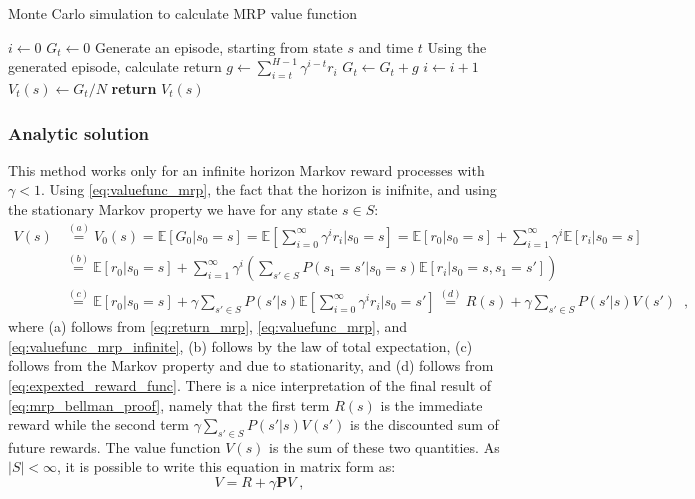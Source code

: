\documentclass{article}
\theoremstyle{definition}
\theoremstyle{remark}
\newcommand{\E}{\mathbb{E}}                                        %
\begin{document}
\begin{algorithm}
\caption{Monte Carlo simulation to calculate MRP value function}\label{alg:mrp1}
\begin{algorithmic}[1]
\State $i\gets 0$
\State $G_t\gets 0$
\State Generate an episode, starting from state $s$ and time $t$
\State Using the generated episode, calculate return $g \gets \sum_{i=t}^{H-1}\gamma^{i-t} r_i$ 
\State $G_t\gets G_t + g$
\State $i\gets i + 1$
\EndWhile\label{mrp1label}
\State $V_t(s) \gets G_t / N$
\State \textbf{return} $V_t(s)$
\EndProcedure
\end{algorithmic}
\end{algorithm}

\subsubsection{Analytic solution}
This method works only for an infinite horizon Markov reward processes with $\gamma < 1$. Using \eqref{eq:valuefunc_mrp}, the fact that the horizon is inifnite, and using the stationary Markov property we have for any state $s \in S$:
\begin{equation}
\begin{split}
V(s) &\stackrel{(a)}{=} V_0(s) = \E[G_0|s_0 = s] = \E \left[\sum_{i=0}^{\infty}\gamma^{i} r_i \bigg|s_0 = s \right] = \E [r_0 | s_0 = s] + \sum_{i=1}^{\infty}\gamma^{i} \E [r_i|s_0 = s] \\
&\stackrel{(b)}{=} \E [r_0 | s_0 = s] + \sum_{i=1}^{\infty}\gamma^{i} \left( \sum_{s' \in S}P(s_1 = s' | s_0 = s) \E [r_i|s_0 = s, s_1 = s'] \right) \\
&\stackrel{(c)}{=} \E [r_0 | s_0 = s] + \gamma \sum_{s' \in S}P(s'|s) \E \left[\sum_{i=0}^{\infty}\gamma^{i} r_i \bigg|s_0 = s' \right] \stackrel{(d)}{=} R(s) + \gamma \sum_{s' \in S}P(s'|s)V(s') \;\;,
\end{split}
\label{eq:mrp_bellman_proof}
\end{equation}
where (a) follows from \eqref{eq:return_mrp}, \eqref{eq:valuefunc_mrp}, and \eqref{eq:valuefunc_mrp_infinite}, (b) follows by the law of total expectation, (c) follows from the Markov property and due to stationarity, and (d) follows from \eqref{eq:expexted_reward_func}. There is a nice interpretation of the final result of \eqref{eq:mrp_bellman_proof}, namely that the first term $R(s)$ is the immediate reward while the second term $\gamma \sum_{s' \in S}P(s'|s)V(s')$ is the discounted sum of future rewards. The value function $V(s)$ is the sum of these two quantities. As $|S| < \infty$, it is possible to write this equation in matrix form as:
\begin{equation}
V = R + \gamma \mathbf{P}V \;,
\label{eq:mrp_bellman_matrix}
\end{equation}
\end{document}
